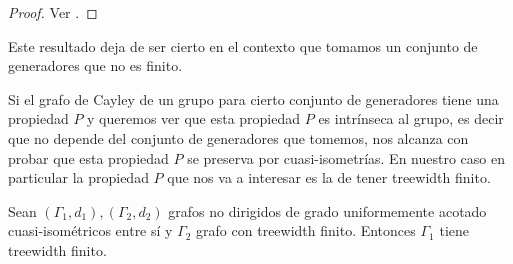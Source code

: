 \documentclass[tesis.tex]{subfiles}
\begin{document}
\begin{proof}
	Ver \cite[p.143]{bridson2013metric}.
\end{proof}

Este resultado deja de ser cierto en el contexto que tomamos un conjunto de generadores que no es finito.


Si el grafo de Cayley de un grupo para cierto conjunto de generadores tiene una propiedad $P$ y queremos ver que esta propiedad $P$ es intrínseca al grupo, es decir que no depende del conjunto de generadores que tomemos, nos alcanza con probar que esta propiedad $P$ se preserva por cuasi-isometrías.
En nuestro caso en particular la propiedad $P$ que nos va a interesar es la de tener treewidth finito.


\begin{prop} \label{treewidth-inv}
	Sean $(\Gamma_{1},d_{1}), (\Gamma_{2}, d_{2})$ grafos no dirigidos de grado uniformemente acotado cuasi-isométricos entre sí y $\Gamma_{2}$ grafo con treewidth finito.
	Entonces $\Gamma_{1}$ tiene treewidth finito.
\end{prop}
%
%	
%	
%	
%	
\end{document}
